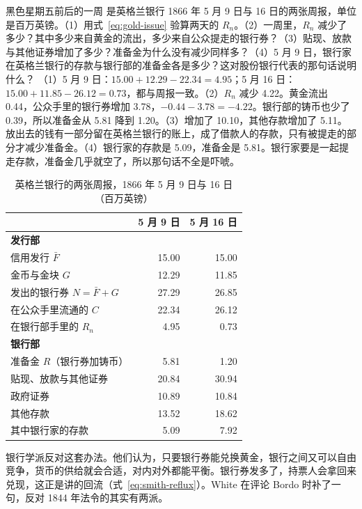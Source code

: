 \begin{example}{黑色星期五前后的一周}\label{ex:gold-week1866}
 是英格兰银行 1866 年 5 月 9 日与 16 日的两张周报，单位是百万英镑。（1）用式~\eqref{eq:gold-issue} 验算两天的 $R_n$。（2）一周里，$R_n$ 减少了多少？其中多少来自黄金的流出，多少来自公众提走的银行券？（3）贴现、放款与其他证券增加了多少？准备金为什么没有减少同样多？（4）5 月 9 日，银行家在英格兰银行的存款与银行部的准备金各是多少？这对股份银行代表的那句话说明什么？
\solution （1）5 月 9 日：$15.00+12.29-22.34=4.95$；5 月 16 日：$15.00+11.85-26.12=0.73$，都与周报一致。（2）$R_n$ 减少 4.22。黄金流出 0.44，公众手里的银行券增加 3.78，$-0.44-3.78=-4.22$。银行部的铸币也少了 0.39，所以准备金从 5.81 降到 1.20。（3）增加了 10.10，其他存款增加了 5.11。放出去的钱有一部分留在英格兰银行的账上，成了借款人的存款，只有被提走的部分才减少准备金。（4）银行家的存款是 5.09，准备金是 5.81。银行家要是一起提走存款，准备金几乎就空了，所以那句话不全是吓唬。
\end{example}

\begin{table}[htbp]\centering\small
\caption{英格兰银行的两张周报，1866 年 5 月 9 日与 16 日（百万英镑）}\label{tab:gold-week1866}
\begin{tabularx}{\linewidth}{@{}Yrr@{}}
\toprule
 & 5 月 9 日 & 5 月 16 日 \\\midrule
\textbf{发行部} & & \\
信用发行 $\bar F$ & 15.00 & 15.00 \\
金币与金块 $G$ & 12.29 & 11.85 \\
发出的银行券 $N=\bar F+G$ & 27.29 & 26.85 \\
\quad 在公众手里流通的 $C$ & 22.34 & 26.12 \\
\quad 在银行部手里的 $R_n$ & 4.95 & 0.73 \\\midrule
\textbf{银行部} & & \\
准备金 $R$（银行券加铸币） & 5.81 & 1.20 \\
贴现、放款与其他证券 & 20.84 & 30.94 \\
政府证券 & 10.89 & 10.84 \\
其他存款 & 13.52 & 18.62 \\
\quad 其中银行家的存款 & 5.09 & 7.92 \\
\bottomrule
\end{tabularx}
\end{table}

银行学派反对这套办法。他们认为，只要银行券能兑换黄金，银行之间又可以自由竞争，货币的供给就会合适，对内对外都能平衡\cite{bordo1984}。银行券发多了，持票人会拿回来兑现，这正是讲的回流（式~\eqref{eq:smith-reflux}）。White 在评论 Bordo 时补了一句，反对 1844 年法令的其实有两派\cite{bordo1984}。

